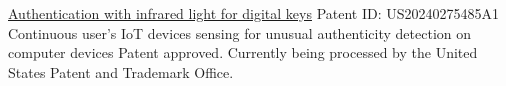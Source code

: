 %
%
%


\begin{patents}
    \patent
        {\href{https://patentcenter.uspto.gov/applications/18108920}
        {Authentication with infrared light for digital keys}}
        {Patent ID: US20240275485A1}
        \newline
    \patent
        {Continuous user's IoT devices sensing for unusual authenticity detection on computer devices}
        {Patent approved. Currently being processed by the United States Patent and Trademark Office.}
        \newline
\end{patents}